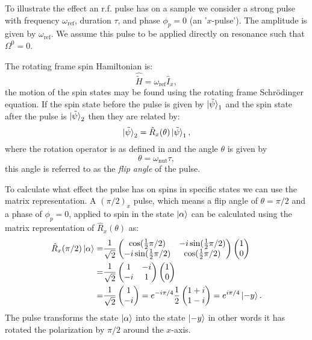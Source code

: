 To illustrate the effect an r.f. pulse has on a sample we consider a strong
pulse with frequency $\omega_\text{ref}$, duration $\tau$, and phase $\phi_p = 0$ (an '$x$-pulse').
The amplitude is given by $\omega_\text{ref}$. We assume this pulse to be applied
directly on resonance such that $\Omega^0 = 0$.

The rotating frame spin Hamiltonian is:
\begin{equation}
  \hat{\tilde{H}} = \omega_{\text{ref}}\hat{I}_x,
\end{equation}
the motion of the spin states may be found using the rotating frame Schr\"odinger equation. If the
spin state before the pulse is given by $\ket{\tilde{\psi}}_1$ and the spin state after the pulse
is $\ket{\tilde{\psi}}_2$ then they are related by:
\begin{equation}
  \ket{\tilde{\psi}}_2 = \hat{R}_x(\theta)\ket{\tilde{\psi}}_1,
\end{equation}
where the rotation operator is as defined in  and the angle
$\theta$ is given by
\begin{equation}
  \theta = \omega_\text{nut}\tau,
\end{equation}
this angle is referred to as the \textit{flip angle} of the pulse.

To calculate what effect the pulse has on spins in specific states we can use the matrix representation.
A $(\pi/2)_x$ pulse, which means a flip angle of $\theta = \pi/2$ and a phase of $\phi_p = 0$, applied to spin in the state $\ket{\alpha}$ can be calculated using the matrix representation of $\hat{R}_x(\theta)$  as:
\begin{align}
  \hat{R}_x(\pi/2)\ket{\alpha} =& \frac{1}{\sqrt{2}}\begin{pmatrix}
     \cos(\frac{1}{2}\pi/2) & -i\sin(\frac{1}{2}\pi/2)\\
     -i\sin(\frac{1}{2}\pi/2) & \cos(\frac{1}{2}\pi/2)
\end{pmatrix}\begin{pmatrix}
  1\\
  0
\end{pmatrix}\\ =& \frac{1}{\sqrt{2}}\begin{pmatrix}
  1 & -i\\
  -i & 1
\end{pmatrix}\begin{pmatrix}
  1\\
  0
\end{pmatrix}\\ =& \frac{1}{\sqrt{2}}\begin{pmatrix}
  1\\
  -i
\end{pmatrix} = e^{-i\pi/4}\frac{1}{2}\begin{pmatrix}
  1+i\\
  1-i
\end{pmatrix} = e^{i\pi/4}\ket{-y}.
\end{align}
The pulse transforms the state $\ket{\alpha}$ into the state $\ket{-y}$ in other words
it has rotated the polarization by $\pi/2$ around the $x$-axis.


